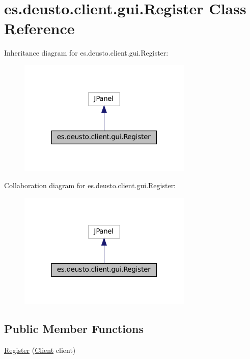 \hypertarget{classes_1_1deusto_1_1client_1_1gui_1_1_register}{}\section{es.\+deusto.\+client.\+gui.\+Register Class Reference}
\label{classes_1_1deusto_1_1client_1_1gui_1_1_register}


Inheritance diagram for es.\+deusto.\+client.\+gui.\+Register\+:
\nopagebreak
\begin{figure}[H]
\begin{center}
\leavevmode
\includegraphics[width=235pt]{classes_1_1deusto_1_1client_1_1gui_1_1_register__inherit__graph}
\end{center}
\end{figure}


Collaboration diagram for es.\+deusto.\+client.\+gui.\+Register\+:
\nopagebreak
\begin{figure}[H]
\begin{center}
\leavevmode
\includegraphics[width=235pt]{classes_1_1deusto_1_1client_1_1gui_1_1_register__coll__graph}
\end{center}
\end{figure}
\subsection*{Public Member Functions}
\begin{DoxyCompactItemize}
\item 
\mbox{\hyperlink{classes_1_1deusto_1_1client_1_1gui_1_1_register_a5b463722d846413a2b1e929207c0f20d}{Register}} (\mbox{\hyperlink{classes_1_1deusto_1_1client_1_1_client}{Client}} client)
\end{DoxyCompactItemize}



